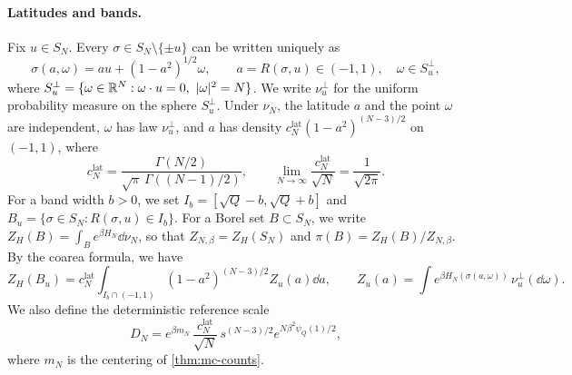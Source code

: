 \paragraph{Latitudes and bands.}
Fix $u\in S_N$. Every $\sigma\in S_N\setminus\{\pm u\}$ can be written uniquely as
\begin{equation}\label{eq:mb-latitude}
\sigma(a,\omega)=au+(1-a^2)^{1/2}\omega,\qquad a=R(\sigma,u)\in(-1,1),\quad \omega\in S_u^\perp,
\end{equation}
where $S_u^\perp=\{\omega\in\mathbb R^N:\omega\cdot u=0,\ |\omega|^2=N\}$.
We write $\nu_u^\perp$ for the uniform probability measure on the sphere $S_u^\perp$. Under $\nu_N$, the latitude $a$ and the point $\omega$ are independent, $\omega$ has law $\nu_u^\perp$, and $a$ has density $c_N^{\mathrm{lat}}(1-a^2)^{(N-3)/2}$ on $(-1,1)$, where
\begin{equation}\label{eq:mb-clat}
c_N^{\mathrm{lat}}=\frac{\Gamma(N/2)}{\sqrt\pi\,\Gamma((N-1)/2)},\qquad \lim_{N\to\infty}\frac{c_N^{\mathrm{lat}}}{\sqrt N}=\frac1{\sqrt{2\pi}} .
\end{equation}
For a band width $b>0$, we set $I_b=[\sqrt Q-b,\sqrt Q+b]$ and $B_u=\{\sigma\in S_N:R(\sigma,u)\in I_b\}$. For a Borel set $B\subset S_N$, we write $Z_H(B)=\int_Be^{\beta H_N}\dd\nu_N$, so that $Z_{N,\beta}=Z_H(S_N)$ and $\pi(B)=Z_H(B)/Z_{N,\beta}$. By the coarea formula, we have
\begin{equation}\label{eq:mb-coarea}
Z_H(B_u)=c_N^{\mathrm{lat}}\int_{I_b\cap(-1,1)}(1-a^2)^{(N-3)/2}Z_u(a)\dd a,\qquad Z_u(a)=\int e^{\beta H_N(\sigma(a,\omega))}\,\nu_u^\perp(\dd\omega).
\end{equation}
We also define the deterministic reference scale
\begin{equation}\label{eq:mb-DN}
D_N=e^{\beta m_N}\,\frac{c_N^{\mathrm{lat}}}{\sqrt N}\,s^{(N-3)/2}e^{N\beta^2\psi_Q(1)/2},
\end{equation}
where $m_N$ is the centering of \cref{thm:mc-counts}.

